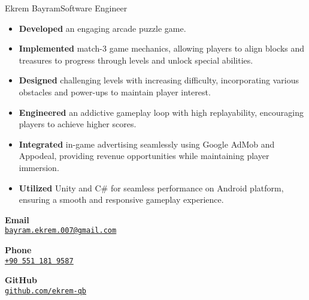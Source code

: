 \documentclass{article}
\begin{document}
\begin{cv}[avatar]{Ekrem Bayram}{Software Engineer}
    \cvseparator[2]
    \begin{cvevent}[2018]
        \begin{itemize}
            \item \textbf{Developed} an engaging arcade puzzle game.
            \item \textbf{Implemented} match-3 game mechanics, allowing players to align blocks and treasures to progress through levels and unlock special abilities.
            \item \textbf{Designed} challenging levels with increasing difficulty, incorporating various obstacles and power-ups to maintain player interest.
            \item \textbf{Engineered} an addictive gameplay loop with high replayability, encouraging players to achieve higher scores.
            \item \textbf{Integrated} in-game advertising seamlessly using Google AdMob and Appodeal, providing revenue opportunities while maintaining player immersion.
            \item \textbf{Utilized} Unity and C\# for seamless performance on Android platform, ensuring a smooth and responsive gameplay experience.
        \end{itemize}
    \end{cvevent}


    \cvsidebar %



    \begin{cvitem}[Envelope][4]
        \textbf{Email}\\
        \href{mailto:bayram.ekrem.007@gmail.com}{\texttt{\uline{bayram.ekrem.007@gmail.com}}}
    \end{cvitem}

    \cvseparator[3]
    \begin{cvitem}[Phone][4]
        \textbf{Phone}\\
        \href{tel:+905511819587}{\texttt{\uline{+90 551 181 9587}}}
    \end{cvitem}

    \cvseparator[3]
    \begin{cvitem}[Github][4]
        \textbf{GitHub}\\
        \href{https://www.github.com/ekrem-qb}{\texttt{\uline{github.com/ekrem-qb}}}
    \end{cvitem}


\end{cv}
\end{document}
